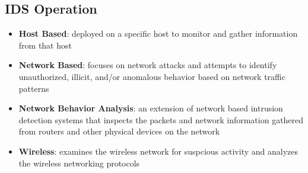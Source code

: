 \documentclass{math}
\begin{document}
\subsection*{IDS Operation}
\begin{itemize}
  \item \textbf{Host Based}: deployed on a specific host to monitor and gather
    information from that host
  \item \textbf{Network Based}: focuses on network attacks and attempts to
    identify unauthorized, illicit, and/or anomalous behavior based on network
    traffic patterns
  \item \textbf{Network Behavior Analysis}: an extension of network based
    intrusion detection systems that inspects the packets and network
    information gathered from routers and other physical devices on the network
  \item \textbf{Wireless}: examines the wireless network for suspcious activity
    and analyzes the wireless networking protocols
\end{itemize}
\end{document}
